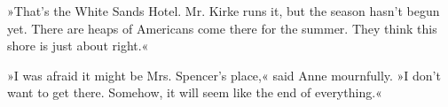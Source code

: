 »That’s the White Sands Hotel. Mr. Kirke runs it, but the season hasn’t begun yet. There are heaps of Americans come there for the summer. They think this shore is just about right.«

»I was afraid it might be Mrs. Spencer’s place,« said Anne mournfully. »I don’t want to get there. Somehow, it will seem like the end of everything.«